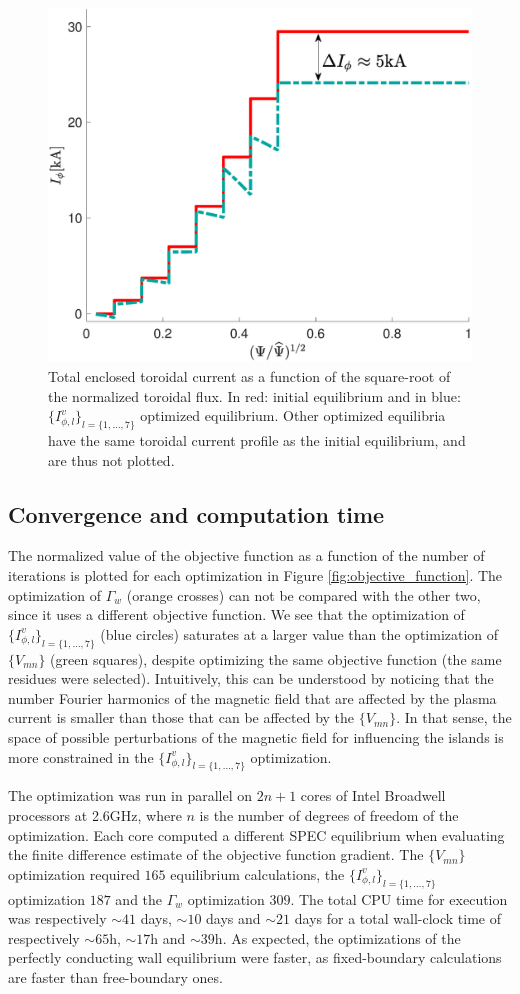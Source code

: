 \documentclass[my_thesis.tex]{subfiles}
\begin{document}
\begin{figure}
    \centering
    \includegraphics[width=.45\textwidth]{main/Figures_Optimization/CurrentProfiles.pdf}
    \caption{Total enclosed toroidal current as a function of the square-root of the normalized toroidal flux. In red: initial equilibrium and in blue: $\{I^v_{\phi,l}\}_{l=\{1,\ldots,7\}}$ optimized equilibrium. Other optimized equilibria have the same toroidal current profile as the initial equilibrium, and are thus not plotted. }
    \label{fig:Iprofile}
\end{figure}





\subsection{Convergence and computation time}

The normalized value of the objective function as a function of the number of iterations is plotted for each optimization in Figure \ref{fig:objective_function}. The optimization of $\Gamma_w$ (orange crosses) can not be compared with the other two, since it uses a different objective function. We see that the optimization of $\{I^v_{\phi,l}\}_{l=\{1,\ldots,7\}}$ (blue circles) saturates at a larger value than the optimization of $\{V_{mn}\}$ (green squares), despite optimizing the same objective function (the same residues were selected). Intuitively, this can be understood by noticing that the number Fourier harmonics of the magnetic field that are affected by the plasma current is smaller than those that can be affected by the $\{V_{mn}\}$. In that sense, the space of possible perturbations of the magnetic field for influencing the islands is more constrained in the $\{I^v_{\phi,l}\}_{l=\{1,\ldots,7\}}$ optimization.

The optimization was run in parallel on $2n+1$ cores of Intel Broadwell processors at 2.6GHz, where $n$ is the number of degrees of freedom of the optimization. Each core computed a different SPEC equilibrium when evaluating the finite difference estimate of the objective function gradient. The $\{V_{mn}\}$ optimization required $165$ equilibrium calculations, the $\{I^v_{\phi,l}\}_{l=\{1,\ldots,7\}}$ optimization  $187$ and the $\Gamma_w$ optimization $309$. The total CPU time for execution was respectively $\sim41$ days, $\sim10$ days and $\sim21$ days for a total wall-clock time of respectively $\sim 65$h, $\sim 17$h and $\sim 39$h. As expected, the optimizations of the perfectly conducting wall equilibrium were faster, as fixed-boundary calculations are faster than free-boundary ones. 
\end{document}
